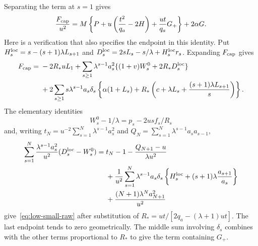 Separating the term at $s=1$ gives
\begin{equation}\label{eq:low-small-raw}
 \frac{F_{\rm cap}}{u^2}
 =M\left\{P+u\left(\frac{t^2}{q_a}-2H\right)
                 +\frac{ut}{q_a}G_+\right\}+2\alpha G.
\end{equation}
Here is a verification that also specifies the endpoint in this
identity.  Put $H_s^{\rm loc}=s-(s+1)\lambda L_{s+1}$ and
$D_s^{\rm loc}=2sL_s-s/\lambda+H_s^{\rm loc}r_s$. Expanding
$F_{\rm cap}$ gives
\begin{align*}
 F_{\rm cap}={}&-2R_*uL_1
 +\sum_{s\ge1}\lambda^{s-1}a_s^2
             \{(1+v)W_s^0+2R_*D_s^{\rm loc}\}\\
 &+2\sum_{s\ge1}s\lambda^{s-1}a_s\delta_s
 \left\{\alpha(1+L_s)+R_*\left(c+\lambda L_s
                         +\frac{(s+1)\lambda L_{s+1}}s\right)\right\}.
\end{align*}
The elementary identities
\[
 W_s^0-1/\lambda=p_s-2us f_s/R_s
\]
and, writing $t_N=u^{-2}\sum_{s=1}^N\lambda^{s-1}a_s^2$ and
$Q_N=\sum_{s=1}^N\lambda^{s-1}a_sa_{s-1}$,
\begin{align*}
 \sum_{s=1}^N\frac{\lambda^{s-1}a_s^2}{u^2}
                  (D_s^{\rm loc}-W_s^0)
 ={}&t_N-1-\frac{Q_{N+1}-u}{\lambda u^2}\\
 &+\frac1{u^2}\sum_{s=1}^N\lambda^{s-1}a_s\delta_s
           \left\{H_s^{\rm loc}+(s+1)\lambda\frac{a_{s+1}}{a_s}\right\}\\
 &+\frac{(N+1)\lambda^Na_{N+1}^2}{u^2}
\end{align*}
give~\eqref{eq:low-small-raw} after substitution of
$R_*=ut/[2q_a-(\lambda+1)ut]$.  The last endpoint tends to zero
geometrically. The middle sum involving $\delta_s$ combines with
the other terms proportional to $R_*$ to give the term containing $G_+$.

